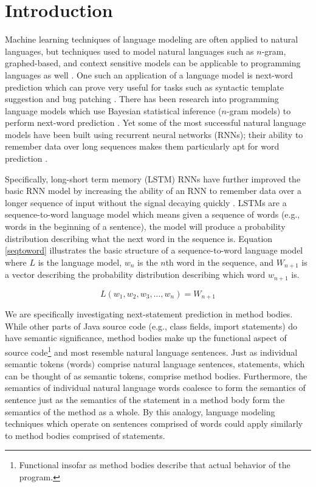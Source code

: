 \documentclass[runningheads,a4paper]{llncs}
\begin{document}
\section{Introduction}
\label{submission}

Machine learning techniques of language modeling are often applied
to natural languages, but techniques used to model natural languages
such as $n$-gram, graphed-based, and context sensitive models
can be applicable to programming languages as well
\cite{Allamanis} \cite{Nguyen} \cite{Asaduzzaman}.
One such an application of a language model is next-word prediction
which can prove very useful for tasks such as syntactic template
suggestion and bug patching
\cite{Nguyen} \cite{Kim}.
There has been research into programming language models
which use Bayesian statistical inference ($n$-gram models)
to perform next-word prediction \cite{Allamanis}.
Yet some of the most successful natural language models have been
built using recurrent neural networks (RNNs); their ability to
remember data over long sequences makes them particularly apt for
word prediction \cite{LSTMArticle}.

Specifically, long-short term memory (LSTM) RNNs have further improved
the basic RNN model by increasing the ability of an RNN to remember
data over a longer sequence of input without the signal decaying
quickly \cite{LSTMArticle}. LSTMs are a sequence-to-word language
model which means given a sequence of words (e.g., words in the
beginning of a sentence), the model will produce a probability
distribution describing what the next word in the sequence is.
Equation \ref{seqtoword} illustrates the basic structure of a
sequence-to-word language model where $L$ is the language model,
$w_n$ is the $n$th word in the sequence, and $W_{n+1}$ is a vector
describing the probability distribution describing which word $w_{n+1}$
is.

\begin{equation}
\label{seqtoword}
    L(w_1, w_2, w_3, \dots, w_n) = W_{n+1}
\end{equation}

We are specifically investigating next-statement prediction in method
bodies. While other parts of Java source code (e.g., class fields,
import statements) do have semantic significance, method bodies make up
the functional aspect of source code\footnote{
Functional insofar as method bodies describe that actual
behavior of the program.} and most resemble natural language sentences.
Just as individual semantic tokens (words) comprise natural language
sentences, statements, which can be thought of as semantic tokens,
comprise method bodies. Furthermore, the semantics of individual natural
language words coalesce to form the semantics of sentence just as the
semantics of the statement in a method body form the semantics of the
method as a whole. By this analogy, language modeling techniques which
operate on sentences comprised of words could apply similarly to method
bodies comprised of statements.
\end{document}
